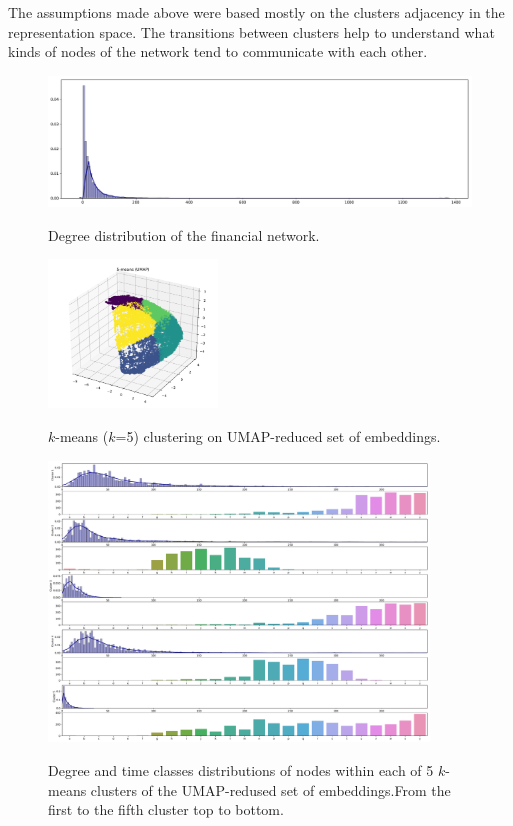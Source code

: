 The assumptions made above were based mostly on the clusters adjacency in the representation space. The transitions between clusters help to understand what kinds of nodes of the network tend to communicate with each other.
\begin{figure}[!ht]
	\centering
	\includegraphics[width=1.0\textwidth]{images/appendix/App17.pdf}\\
	\caption{Degree distribution of the financial network.}
	\label{fig:App17}
\end{figure}
\begin{figure}[!ht]
	\centering
	\includegraphics[width=0.4\textwidth]{images/appendix/App19.pdf}\\
	\caption{$k$-means ($k$=5) clustering on UMAP-reduced set of embeddings.}
	\label{fig:App19}
\end{figure}
\begin{figure}[!ht]
	\centering
	\includegraphics[width=0.9\textwidth]{images/appendix/App18.pdf}\\
	\caption{Degree and time classes distributions of nodes within each of 5 $k$-means clusters of the UMAP-redused set of embeddings.From the first to the fifth cluster top to bottom.}
	\label{fig:App18}
\end{figure}

